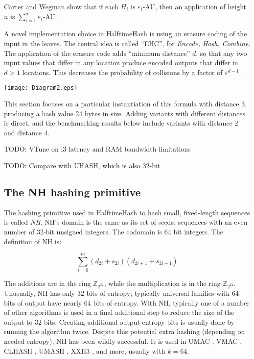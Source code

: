 \documentclass[sigconf, nonacm]{acmart}
\newcommand{\ints}{\mathbb{Z}}
\begin{document}
Carter and Wegman show that if each $H_i$ is $\varepsilon_i$-AU, then an application of height $n$ is $\sum_{i=1}^n \varepsilon_i$-AU.

A novel implementation choice in HalftimeHash is using an erasure coding of the input in the leaves.
The central idea is called ``EHC'', for {\em Encode, Hash, Combine}. \cite{ehc-nandi}
The application of the erasure code adds ``minimum distance'' $d$, so that any two input values that differ in any location produce encoded outputs that differ in $d > 1$ locations.
This decreases the probability of collisions by a factor of $\varepsilon^{d-1}$.

\texttt{[image: Diagram2.eps]}

This section focuses on a particular instantiation of this formula with distance $3$, producing a hash value $24$ bytes in size.
Adding variants with different distances is direct, and the benchmarking results below include variants with distance $2$ and distance $4$.

TODO: VTune on l3 latency and RAM bandwidth limitations

 TODO: Compare with UHASH, which is also 32-bit

\subsection{The NH hashing primitive}

The hashing primitive used in HalftimeHash to hash small, fixed-length sequences is called {\em NH}. \cite{umac}
NH's domain is the same as its set of seeds: sequences with an even number of 32-bit unsigned integers.
The codomain is 64 bit integers.
The definition of NH is:

$$\sum_{i=0}^m (d_{2i} + s_{2i})(d_{2i+1} + s_{2i+1})$$

The additions are in the ring $\ints_{2^{32}}$, while the multiplication is in the ring $\ints_{2^{64}}$.
Unusually, NH has only $32$ bits of entropy; typically universal families with $64$ bits of output have nearly $64$ bits of entropy. \cite{umash,clhash}
With NH, typically one of a number of other algorithms is used in a final additional step to reduce the size of the output to $32$ bits.
Creating additional output entropy bits is usually done by running the algorithm twice. \cite{umash,umac}
Despite this potential extra hashing (depending on needed entropy), NH has been wildly successful.
It is used in UMAC \cite{umac}, VMAC \cite{vmac}, CLHASH \cite{clhash}, UMASH \cite{umash}, XXH3 \cite{xxh3}, and more, usually with $k = 64$.
\end{document}
